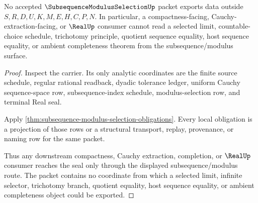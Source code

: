 \begin{theorem}
\label{thm:subsequence-modulus-selection-nonescape}
No accepted $\SubsequenceModulusSelectionUp$ packet exports data outside $S,R,D,U,K,M,E,H,C,P,N$. In particular, a compactness-facing, Cauchy-extraction-facing, or $\RealUp$ consumer cannot read a selected limit, countable-choice schedule, trichotomy principle, quotient sequence equality, host sequence equality, or ambient completeness theorem from the subsequence/modulus surface.
\end{theorem}
\begin{proof}
Inspect the carrier. Its only analytic coordinates are the finite source schedule, regular rational readback, dyadic tolerance ledger, uniform Cauchy sequence-space row, subsequence-index schedule, modulus-selection row, and terminal Real seal.

Apply \autoref{thm:subsequence-modulus-selection-obligations}. Every local obligation is a projection of those rows or a structural transport, replay, provenance, or naming row for the same packet.

Thus any downstream compactness, Cauchy extraction, completion, or $\RealUp$ consumer reaches the seal only through the displayed subsequence/modulus route. The packet contains no coordinate from which a selected limit, infinite selector, trichotomy branch, quotient equality, host sequence equality, or ambient completeness object could be exported.
\end{proof}




